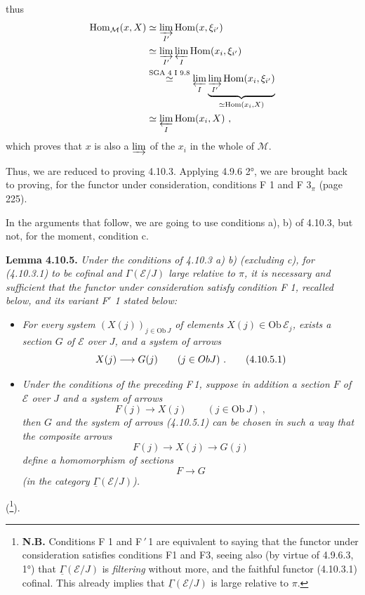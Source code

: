 \documentclass[11pt]{article}
\newcommand{\printedpage}[1]{\marginpar{\footnotesize p.~#1}}
\newcommand{\msp}[1]{\marginpar{\footnotesize [#1]}}
\newcommand{\uGamma}{\underline{\Gamma}}
\newcommand{\Hom}{\operatorname{Hom}}
\newcommand{\Ob}{\mathrm{Ob}\,}
\begin{document}
\printedpage{94}
thus
\[
\begin{aligned}
\Hom_{\mathcal{M}}(x,X) &\simeq \varinjlim_{I'} \Hom(x,\xi_{i'})\\
&\simeq \varinjlim_{I'} \varprojlim_{I} \Hom(x_i,\xi_{i'})\\
&\overset{\text{SGA 4 I 9.8}}{\simeq} \varprojlim_{I} \underbrace{\varinjlim_{I'} \Hom(x_i,\xi_{i'})}_{\simeq \Hom(x_i,X)}\\
&\simeq \varprojlim_{I} \Hom(x_i,X)\ ,
\end{aligned}
\]
which proves that $x$ is also a $\varinjlim$ of the $x_i$ in the whole of $\mathcal{M}$.

\msp{250}
Thus, we are reduced to proving 4.10.3. Applying 4.9.6 2°, we are brought back to proving, for the functor under consideration, conditions F 1 and F $3_\pi$ (page 225).

In the arguments that follow, we are going to use conditions a), b) of 4.10.3, but not, for the moment, condition c.

\textbf{Lemma 4.10.5.} \textit{Under the conditions of 4.10.3 a) b) (excluding c), for (4.10.3.1) to be cofinal and $\Gamma(\mathcal{E}/J)$ large relative to $\pi$, it is necessary and sufficient that the functor under consideration satisfy condition F 1, recalled below, and its variant F$'$ 1 stated below:}
\begin{itemize}[leftmargin=3em]
\item[F\,1)] {\itshape For every system $(X(j))_{j\in\Ob J}$ of elements $X(j)\in\Ob\mathcal{E}_j$, exists a \textup{section} $G$ of $\mathcal{E}$ over $J$, and a system of arrows
\[
X(j) \longrightarrow G(j) \qquad (j\in ObJ)\ . \tag*{\textup{(4.10.5.1)}}
\]}
\item[F$'$1)] {\itshape Under the conditions of the preceding \textup{F\,1}, suppose in addition a section $F$ of $\mathcal{E}$ over $J$ \msp{251} and a system of arrows
\[
F(j) \longrightarrow X(j) \qquad (j\in\Ob J)\ ,
\]
then $G$ and the system of arrows (4.10.5.1) can be chosen in such a way that the composite arrows
\[
F(j) \longrightarrow X(j) \longrightarrow G(j)
\]
define a homomorphism of sections
\[
F \longrightarrow G
\]
(in the category $\uGamma(\mathcal{E}/J)$).}
\end{itemize}
(\footnote[106]{\textbf{N.B.} Conditions F 1 and F$\,'$\,1 are equivalent to saying that the functor under consideration satisfies conditions F1 and F3, seeing also (by virtue of 4.9.6.3, 1°) that $\uGamma(\mathcal{E}/J)$ is \textit{filtering} without more, and the faithful functor (4.10.3.1) cofinal. This already implies that $\uGamma(\mathcal{E}/J)$ is large relative to $\pi$.}).
\end{document}
